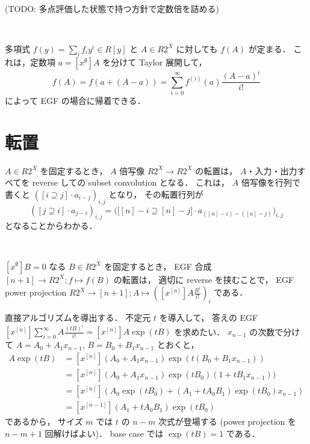 \documentclass{jsarticle}
\begin{document}
\

(TODO: 多点評価した状態で持つ方針で定数倍を詰める)

\

多項式 $f(y) = \sum_i f_i y^i \in R[y]$ と
$A \in R 2^X$ に対しても
$f(A)$ が定まる．
これは，定数項 $a = [x^\emptyset] A$ を分けて Taylor 展開して，
\[
  f(A) = f(a + (A-a)) = \sum_{i=0}^\infty f^{(i)}(a) \frac{(A-a)^i}{i!}
\]
によって EGF の場合に帰着できる．


\section{転置}
$A \in R 2^X$ を固定するとき，
$A$ 倍写像 $R 2^X \to R 2^X$ の転置は，
$A$・入力・出力すべてを reverse しての subset convolution となる．
これは，
$A$ 倍写像を行列で書くと $([i \supseteq j] \cdot a_{i-j})_{i,j}$ となり，
その転置行列が
\[
  ([j \supseteq i] \cdot a_{j-i})_{i,j}
  = \bigl(\bigl[[n]-i \supseteq [n]-j\bigr] \cdot a_{([n]-i)-([n]-j)}\bigr)_{i,j}
\]
となることからわかる．

\

$[x^\emptyset] B = 0$ なる
$B \in R 2^X$ を固定するとき，
EGF 合成 $[n+1] \to R 2^X; f \mapsto f(B)$ の転置は，
適切に reverse を挟むことで，
EGF power projection $R 2^X \to [n+1]; A \mapsto \left([x^{[n]}] A \frac{B^i}{i!}\right)_i$
である．

直接アルゴリズムを導出する．
不定元 $t$ を導入して，
答えの EGF $[x^{[n]}] \sum_{i=0}^\infty A \frac{(tB)^i}{i!} = [x^{[n]}] A \exp(tB)$ を求めたい．
$x_{n-1}$ の次数で分けて
$A = A_0 + A_1 x_{n-1}$,
$B = B_0 + B_1 x_{n-1}$ とおくと，
\begin{align*}
  [x^{[n]}] A \exp(tB)
  &= [x^{[n]}] (A_0 + A_1 x_{n-1}) \exp(t (B_0 + B_1 x_{n-1})) \\
  &= [x^{[n]}] (A_0 + A_1 x_{n-1}) \exp(t B_0) (1 + t B_1 x_{n-1})) \\
  &= [x^{[n]}] \left(A_0 \exp(t B_0) + (A_1 + t A_0 B_1) \exp(t B_0) x_{n-1}\right) \\
  &= [x^{[n-1]}] (A_1 + t A_0 B_1) \exp(t B_0)
\end{align*}
であるから，
サイズ $m$ では $t$ の $n-m$ 次式が登場する (power projection を $n-m+1$ 回解けばよい)．
base case では $\exp(t B) = 1$ である．
\end{document}
